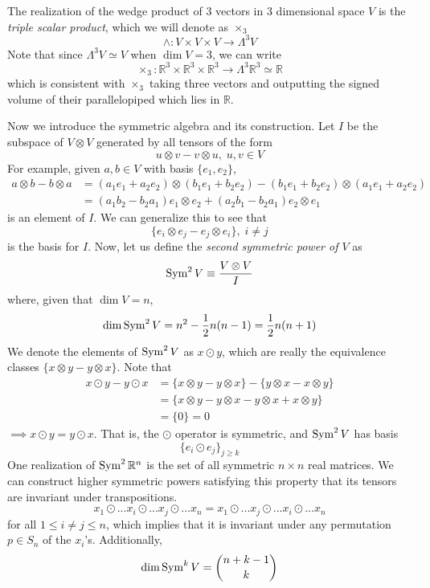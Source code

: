   \begin{example}
  The realization of the wedge product of 3 vectors in 3 dimensional space $V$ is the \textit{triple scalar product}, which we will denote as $\times_3$
  \[\wedge: V \times V \times V \longrightarrow \Lambda^3 V\]
  Note that since $\Lambda^3 V \simeq V$ when $\dim{V} = 3$, we can write 
  \[\times_3: \mathbb{R}^3 \times \mathbb{R}^3 \times \mathbb{R}^3 \longrightarrow \Lambda^3 \mathbb{R}^3 \simeq \mathbb{R}\]
  which is consistent with $\times_3$ taking three vectors and outputting the signed volume of their parallelopiped which lies in $\mathbb{R}$. 
  \end{example}

  Now we introduce the symmetric algebra and its construction. Let $I$ be the subspace of $V \otimes V$ generated by all tensors of the form 
  \[u \otimes v - v \otimes u, \; u, v \in V\]
  For example, given $a, b \in V$ with basis $\{e_1, e_2\}$, 
  \begin{align*}
      a \otimes b - b \otimes a & = (a_1 e_1 + a_2 e_2) \otimes (b_1 e_1 + b_2 e_2) - (b_1 e_1 + b_2 e_2) \otimes (a_1 e_1 + a_2 e_2) \\
      & = (a_1 b_2 - b_2 a_1) e_1 \otimes e_2 + (a_2 b_1 - b_2 a_1) e_2 \otimes e_1 
  \end{align*}
  is an element of $I$. We can generalize this to see that
  \[\{e_i \otimes e_j - e_j \otimes e_i\}, \; i \neq j\]
  is the basis for $I$. Now, let us define the \textit{second symmetric power of $V$} as 
  \[\Sym^2 V \equiv \frac{V \otimes V}{I}\]
  where, given that $\dim{V} = n$, 
  \[\dim{\Sym^2 V} = n^2 - \frac{1}{2} n (n-1) = \frac{1}{2} n (n+1)\]
  We denote the elements of $\Sym^2 V$ as $x \odot y$, which are really the equivalence classes $\{x \otimes y - y \otimes x\}$. Note that
  \begin{align*}
      x \odot y - y \odot x & = \{x \otimes y - y \otimes x\} - \{ y \otimes x - x \otimes y\} \\
      & = \{ x \otimes y - y \otimes x - y \otimes x + x \otimes y\} \\
      & = \{0\} = 0
  \end{align*}
  $\implies x \odot y = y \odot x$. That is, the $\odot$ operator is symmetric, and $\Sym^2 V$ has basis 
  \[ \{e_i \odot e_j\}_{j \geq k}\]
  One realization of $\Sym^2 \mathbb{R}^n$ is the set of all symmetric $n \times n$ real matrices. We can construct higher symmetric powers satisfying this property that its tensors are invariant under transpositions. 
  \[x_1 \odot ... x_i \odot ... x_j \odot ... x_n = x_1 \odot ... x_j \odot ... x_i \odot ... x_n\]
  for all $1 \leq i \neq j \leq n$, which implies that it is invariant under any permutation $p \in S_n$ of the $x_i$'s. Additionally, 
  \[\dim{\Sym^k V} = \binom{n+k-1}{k}\]

